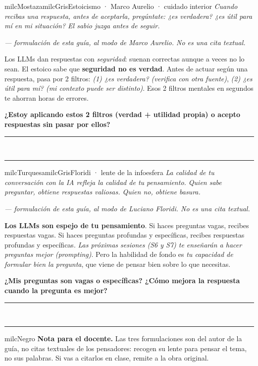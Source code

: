 \documentclass[11pt,letterpaper]{article}
\newcommand{\linead}[1]{\noindent\color{milcLinea}\rule{#1}{0.5pt}\color{milcNegro}}
\begin{document}
\begin{softbox}{milcMostaza}{milcGris}{Estoicismo · Marco Aurelio · cuidado interior}
\textit{Cuando recibas una respuesta, antes de aceptarla, pregúntate: ¿es verdadera? ¿es útil para mí en mi situación? El sabio juzga antes de seguir.}

{\footnotesize\itshape\color{milcNegro!70}--- formulación de esta guía, al modo de Marco Aurelio. No es una cita textual.}

Los LLMs dan respuestas con \emph{seguridad}: suenan correctas aunque a veces no lo sean. El estoico sabe que \textbf{seguridad no es verdad}. Antes de actuar según una respuesta, pasa por 2 filtros: \emph{(1) ¿es verdadera? (verifica con otra fuente)}, \emph{(2) ¿es útil para mí? (mi contexto puede ser distinto)}. Esos 2 filtros mentales en segundos te ahorran horas de errores.

\textbf{¿Estoy aplicando estos 2 filtros (verdad + utilidad propia) o acepto respuestas sin pasar por ellos?}
\end{softbox}
\linead{\linewidth}\\[1mm]
\linead{\linewidth}

\begin{softbox}{milcTurquesa}{milcGris}{Floridi · lente de la infoesfera}
\textit{La calidad de tu conversación con la IA refleja la calidad de tu pensamiento. Quien sabe preguntar, obtiene respuestas valiosas. Quien no, obtiene basura.}

{\footnotesize\itshape\color{milcNegro!70}--- formulación de esta guía, al modo de Luciano Floridi. No es una cita textual.}

\textbf{Los LLMs son espejo de tu pensamiento}. Si haces preguntas vagas, recibes respuestas vagas. Si haces preguntas profundas y específicas, recibes respuestas profundas y específicas. \emph{Las próximas sesiones (S6 y S7) te enseñarán a hacer preguntas mejor (prompting)}. Pero la habilidad de fondo es \emph{tu capacidad de formular bien la pregunta}, que viene de pensar bien sobre lo que necesitas.

\textbf{¿Mis preguntas son vagas o específicas? ¿Cómo mejora la respuesta cuando la pregunta es mejor?}
\end{softbox}
\linead{\linewidth}\\[1mm]
\linead{\linewidth}

\begin{infoband}{milcNegro}
\textbf{Nota para el docente.} Las tres formulaciones son del autor de la guía, no citas textuales de los pensadores: recogen su lente para pensar el tema, no sus palabras. Si vas a citarlos en clase, remite a la obra original.
\end{infoband}
\end{document}
